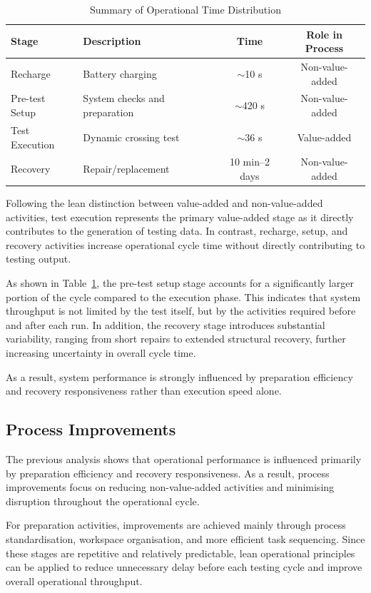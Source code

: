 \documentclass[11pt, a4paper]{report}
\numberwithin{equation}{section}
\begin{document}
\begin{refsection}
\begin{table}[H]
\caption{Summary of Operational Time Distribution}
\label{tab:operation_time}

\begin{tabularx}{\textwidth}{l X c c}
\toprule
Stage & Description & Time & Role in Process \\
\midrule
Recharge & Battery charging & $\sim$10 s & Non-value-added \\
Pre-test Setup & System checks and preparation & $\sim$420 s & Non-value-added \\
Test Execution & Dynamic crossing test & $\sim$36 s & Value-added \\
Recovery & Repair/replacement & 10 min--2 days & Non-value-added \\
\bottomrule
\end{tabularx}
\end{table}

Following the lean distinction between value-added and non-value-added activities, test execution represents the primary value-added stage as it directly contributes to the generation of testing data. In contrast, recharge, setup, and recovery activities increase operational cycle time without directly contributing to testing output.\cite{value_added}

As shown in Table~\ref{tab:operation_time}, the pre-test setup stage accounts for a significantly larger portion of the cycle compared to the execution phase. This indicates that system throughput is not limited by the test itself, but by the activities required before and after each run. In addition, the recovery stage introduces substantial variability, ranging from short repairs to extended structural recovery, further increasing uncertainty in overall cycle time.

As a result, system performance is strongly influenced by preparation efficiency and recovery responsiveness rather than execution speed alone.

\subsection{Process Improvements}

The previous analysis shows that operational performance is influenced primarily by preparation efficiency and recovery responsiveness. As a result, process improvements focus on reducing non-value-added activities and minimising disruption throughout the operational cycle.

For preparation activities, improvements are achieved mainly through process standardisation, workspace organisation, and more efficient task sequencing. Since these stages are repetitive and relatively predictable, lean operational principles can be applied to reduce unnecessary delay before each testing cycle and improve overall operational throughput.


\end{refsection}
\end{document}
